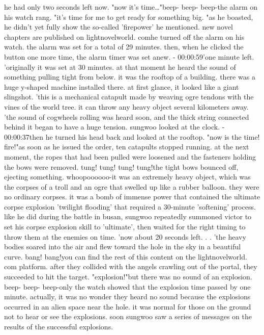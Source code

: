 he had only two seconds left now.
"now it's time…"beep- beep- beep-the alarm on his watch rang.
"it's time for me to get ready for something big.
"as he boasted, he didn't yet fully show the so-called 'firepower' he mentioned.
new novel chapters are published on lightnovelworld.
comhe turned off the alarm on his watch.
 the alarm was set for a total of 29 minutes.
then, when he clicked the button one more time, the alarm timer was set anew.
- 00:00:59'one minute left.
'originally it was set at 30 minutes.
at that moment he heard the sound of something pulling tight from below.
 it was the rooftop of a building.
 there was a huge y-shaped machine installed there.
 at first glance, it looked like a giant slingshot.
'this is a mechanical catapult made by weaving ogre tendons with the vines of the world tree.
 it can throw any heavy object several kilometers away.
'the sound of cogwheels rolling was heard soon, and the thick string connected behind it began to have a huge tension.
sungwoo looked at the clock.
- 00:00:37then he turned his head back and looked at the rooftop.
"now is the time! fire!"as soon as he issued the order, ten catapults stopped running.
 at the next moment, the ropes that had been pulled were loosened and the fasteners holding the bows were removed.
tung! tung! tung! tung!the tight bows bounced off, ejecting something.
whoopoooooo-it was an extremely heavy object, which was the corpses of a troll and an ogre that swelled up like a rubber balloon.
 they were no ordinary corpses.
 it was a bomb of immense power that contained the ultimate corpse explosion 'twilight flooding' that required a 30-minute 'softening' process.
like he did during the battle in busan, sungwoo repeatedly summoned victor to set his corpse explosion skill to 'ultimate', then waited for the right timing to throw them at the enemies on time.
'now about 20 seconds left.
.
.
'the heavy bodies soared into the air and flew toward the hole in the sky in a beautiful curve.
bang! bang!you can find the rest of this content on the lightnovelworld.
com platform.
after they collided with the angels crawling out of the portal, they succeeded to hit the target.
"explosion!"but there was no sound of an explosion.
beep- beep- beep-only the watch showed that the explosion time passed by one minute.
actually, it was no wonder they heard no sound because the explosions occurred in an alien space near the hole.
 it was normal for those on the ground not to hear or see the explosions.
soon sungwoo saw a series of messages on the results of the successful explosions.


